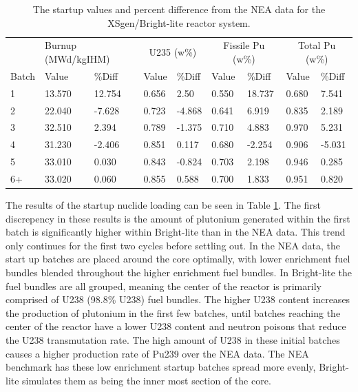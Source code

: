 \documentclass{article}
\begin{document}
\begin{table}[!htb]
\centering
\caption{The startup values and percent difference from the NEA data for the XSgen/Bright-lite reactor system.}
\label{tab:c}
\begin{tabular}{l ll ll ll ll}
 & \multicolumn{2}{p{1cm}}{Burnup (MWd/kgIHM)} & \multicolumn{2}{c}{U235 (w\%)} & \multicolumn{2}{c}{Fissile Pu (w\%)} & \multicolumn{2}{c}{Total Pu (w\%)} \\
Batch & Value & \%Diff & Value & \%Diff & Value & \%Diff & Value & \%Diff \\
1 & 13.570 & 12.754 & 0.656 & 2.50 & 0.550 & 18.737 & 0.680 & 7.541 \\
2 & 22.040 & -7.628 & 0.723 & -4.868 & 0.641 & 6.919 & 0.835 & 2.189 \\
3 & 32.510 & 2.394 & 0.789 & -1.375 & 0.710 & 4.883 & 0.970 & 5.231 \\
4 & 31.230 & -2.406 & 0.851 & 0.117 & 0.680 & -2.254 & 0.906 & -5.031 \\
5 & 33.010 & 0.030 & 0.843 & -0.824 & 0.703 & 2.198 & 0.946 & 0.285 \\
6+ & 33.020 & 0.060 & 0.855 & 0.588 & 0.700 & 1.833 & 0.951 & 0.820
\end{tabular}
\end{table}

The results of the startup nuclide loading can be seen in Table \ref{tab:c}.
The first discrepency in these results is the amount of plutonium generated
within the first batch is significantly higher within Bright-lite than in the NEA data.
This trend only continues for the first two cycles before settling out. In the NEA data, the start up batches 
are placed around the core optimally, with lower enrichment fuel bundles blended throughout the 
higher enrichment fuel bundles. In Bright-lite the fuel bundles are all grouped, meaning the center of 
the reactor is primarily comprised of U238 (98.8\% U238) fuel bundles. The higher U238 content
increases the production of plutonium in the first few batches, until batches reaching the center of
the reactor have a lower U238 content and neutron poisons that reduce the U238 transmutation 
rate. 
The high amount of U238 in these initial batches causes a higher production rate of
Pu239 over the NEA data. The NEA benchmark has these low enrichment startup batches
spread more evenly, Bright-lite simulates them as being the inner most section of the core.
\end{document}
